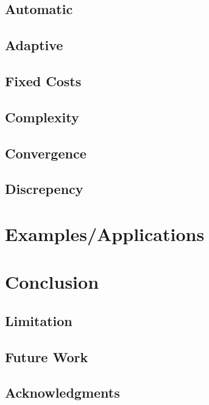 \documentclass[acmtoms]{doc_acmtrans2m}
\begin{document}
\subsection{Automatic}

\subsection{Adaptive}

\subsection{Fixed Costs}

\subsection{Complexity}

\subsection{Convergence}

\subsection{Discrepency}


\section{Examples/Applications}
\label{sec:ex}


\section{Conclusion}
\label{sec:con}


\subsection{Limitation}


\subsection{Future Work}


\frenchspacing





\subsection*{Acknowledgments}


{\small }
\end{document}

